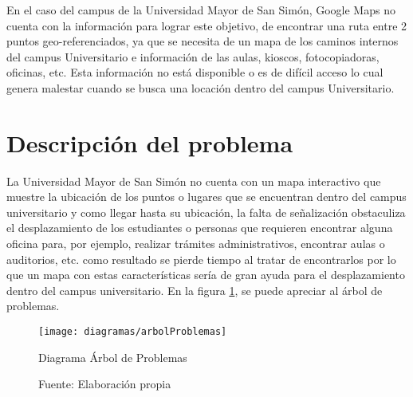   En el caso del campus de la Universidad Mayor de San Simón, Google Maps no cuenta con la información para lograr este objetivo, de encontrar una ruta entre 2 puntos geo-referenciados, ya que se necesita de un mapa de los caminos internos del campus Universitario e información de las aulas, kioscos, fotocopiadoras, oficinas, etc. Esta información no está disponible o es de difícil acceso lo cual genera malestar cuando se busca una locación dentro del campus Universitario.

  \section{Descripción del problema} %
  \label{sec:desc_probl}


  La Universidad Mayor de San Simón no cuenta con un mapa interactivo que
  muestre la ubicación de los puntos o lugares que se encuentran dentro del
  campus universitario y como llegar hasta su ubicación, la falta de señalización obstaculiza el desplazamiento de los estudiantes o personas que requieren encontrar alguna oficina para, por ejemplo, realizar trámites administrativos, encontrar aulas o auditorios, etc. como resultado se pierde tiempo al tratar de encontrarlos por lo que un mapa con estas características sería de gran ayuda para el desplazamiento dentro del campus universitario. En la figura  \ref{fig:arbolProblemas}, se puede apreciar al árbol de problemas.



  \begin{figure}[H]
    \begin{center}
      \texttt{[image: diagramas/arbolProblemas]}
    \end{center}
    \caption{Diagrama Árbol de Problemas}
    \label{fig:arbolProblemas}
    \caption*{Fuente: Elaboración propia}
  \end{figure}

